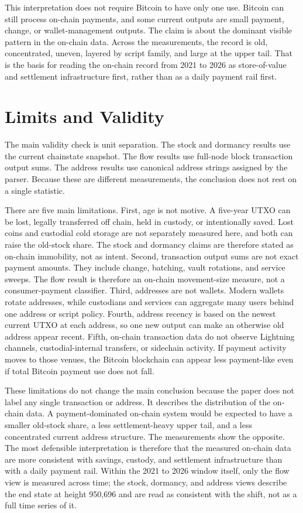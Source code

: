\documentclass[conference]{IEEEtran}
\begin{document}
This interpretation does not require Bitcoin to have only one use. Bitcoin
can still process on-chain payments, and some current outputs are small
payment, change, or wallet-management outputs. The claim is about the
dominant visible pattern in the on-chain data. Across the measurements, the
record is old, concentrated, uneven, layered by script family, and large at
the upper tail. That is the basis for reading the on-chain record from 2021 to 2026
as store-of-value and settlement infrastructure first, rather than as a
daily payment rail first.

\section{Limits and Validity}\label{sec:robustness}

The main validity check is unit separation. The stock and dormancy results
use the current chainstate snapshot. The flow results use full-node block
transaction output sums. The address results use canonical address strings
assigned by the parser. Because these are different measurements, the
conclusion does not rest on a single statistic.

There are five main limitations. First, age is not motive. A five-year UTXO
can be lost, legally transferred off chain, held in custody, or intentionally
saved. Lost coins and custodial cold storage are not separately measured
here, and both can raise the old-stock share. The stock and dormancy claims
are therefore stated as on-chain immobility, not as intent. Second,
transaction output sums are not exact payment amounts. They include change,
batching, vault rotations, and service sweeps. The flow result is therefore
an on-chain movement-size measure, not a consumer-payment classifier. Third,
addresses are not wallets. Modern wallets rotate addresses, while custodians
and services can aggregate many users behind one address or script policy.
Fourth, address recency is based on the newest current UTXO at each address,
so one new output can make an otherwise old address appear recent. Fifth,
on-chain transaction data do not observe Lightning channels,
custodial-internal transfers, or sidechain activity. If payment activity
moves to those venues, the Bitcoin blockchain can appear less payment-like
even if total Bitcoin payment use does not fall.

These limitations do not change the main conclusion because the paper does
not label any single transaction or address. It describes the distribution
of the on-chain data. A payment-dominated on-chain system would be expected
to have a smaller old-stock share, a less settlement-heavy upper tail, and a
less concentrated current address structure. The measurements show the
opposite. The most defensible interpretation is therefore that the measured
on-chain data are more consistent with savings, custody, and settlement
infrastructure than with a daily payment rail. Within the 2021 to 2026 window
itself, only the flow view is measured across time; the stock, dormancy, and
address views describe the end state at height 950{,}696 and are read as
consistent with the shift, not as a full time series of it.
\end{document}
